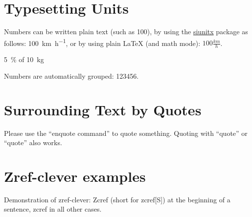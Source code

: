 \documentclass[../thesis-example]{subfiles}
\begin{document}

\section{Typesetting Units}

\begin{ltgexample}
Numbers can be written plain text (such as 100), by using the \href{https://ctan.org/pkg/siunitx}{siunitx} package as follows:
\SI{100}{\km\per\hour},
or by using plain \LaTeX{} (and math mode):
$100 \frac{\mathit{km}}{h}$.
\end{ltgexample}

\begin{ltgexample}
\SI{5}{\percent} of \SI{10}{kg}
\end{ltgexample}

\begin{ltgexample}
Numbers are automatically grouped: \num{123456}.
\end{ltgexample}

\section{Surrounding Text by Quotes}

\begin{ltgexample}
Please use the \enquote{enquote command} to quote something.
Quoting with "`quote"' or ``quote'' also works. %

\end{ltgexample}

\section{Zref-clever examples}
\label{sec:ex:cref}

Demonstration of zref-clever: Zcref (short for zcref[S]) at the beginning of a sentence, zcref in all other cases.
\end{document}
